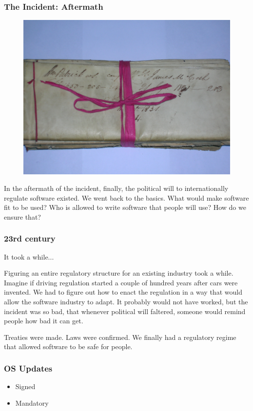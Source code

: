 \begin{frame}[fragile]
\frametitle{The Incident: Aftermath}

\begin{figure}
\includegraphics[scale=0.5]{redtape}
\end{figure}

\end{frame}

In the aftermath of the incident,
finally,
the political will to internationally regulate software existed.
We went back to the basics.
What would make software fit to be used?
Who is allowed to write software that people will use?
How do we ensure that?

\begin{frame}[fragile]
\frametitle{23rd century}

It took a while...

\end{frame}

Figuring an entire regulatory structure for an existing industry took a while.
Imagine if driving regulation started a couple of hundred years after
cars were invented.
We had to figure out how to enact the regulation in a way that would
allow the software industry to adapt.
It probably would not have worked,
but the incident was so bad,
that whenever political will faltered,
someone would remind people how bad it can get.

Treaties were made.
Laws were confirmed.
We finally had a regulatory regime that allowed software to be safe for people.

\begin{frame}[fragile]
\frametitle{OS Updates}

\begin{itemize}
\item Signed
\item Mandatory
\end{itemize}

\end{frame}

